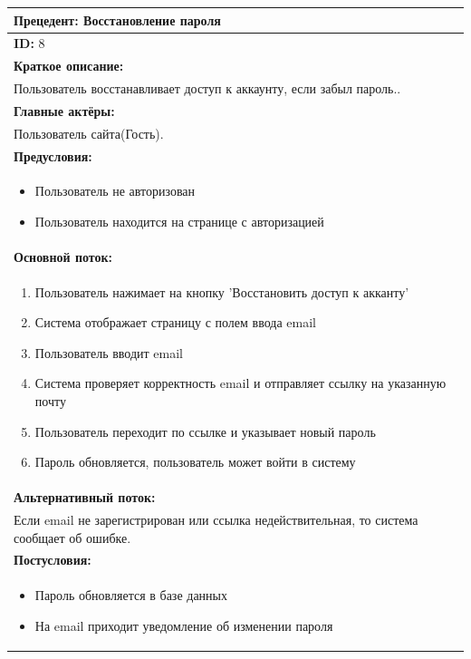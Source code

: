 \documentclass{scrreprt}
\begin{document}
\vspace{10px}
\noindent
\begin{tabularx}{\textwidth}{|X|}
	\hline
	\textbf{Прецедент: Восстановление пароля} \\
	\hline
	\textbf{ID:} 8 \\
	\hline
	\textbf{Краткое описание:} \\
	Пользователь восстанавливает доступ к аккаунту, если забыл пароль.. \\
	\hline
	\textbf{Главные актёры:} \\
	Пользователь сайта(Гость). \\
	\hline
	\textbf{Предусловия:} \\
	\begin{itemize}[nosep,leftmargin=*]
		\item Пользователь не авторизован 
		\item Пользователь находится на странице с авторизацией
	\end{itemize} \\
	\hline
	\textbf{Основной поток:} \\
	\begin{enumerate}[nosep,leftmargin=*]
		\item Пользователь нажимает на кнопку 'Восстановить доступ к акканту'
		\item Система отображает страницу с полем ввода email
		\item Пользователь вводит email
		\item Система проверяет корректность email и отправляет ссылку на указанную почту
		\item Пользователь переходит по ссылке и указывает новый пароль
		\item Пароль обновляется, пользователь может войти в систему
	\end{enumerate} \\
	\hline
	\textbf{Альтернативный поток:} \\
	Если email не зарегистрирован или ссылка недействительная, то система сообщает об ошибке.\\
	\hline
	\textbf{Постусловия:} \\
	\begin{itemize}[nosep,leftmargin=*]
		\item Пароль обновляется в базе данных
		\item На email приходит уведомление об изменении пароля
	\end{itemize} \\
	\hline
\end{tabularx}
\end{document}
